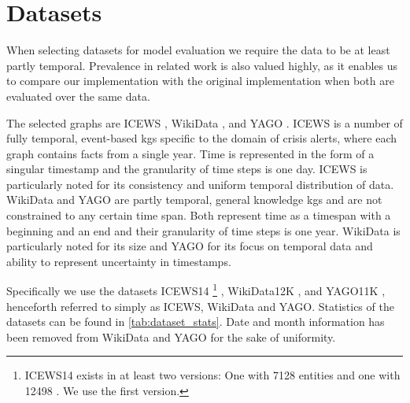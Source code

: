 \section{Datasets}
\label{sec:datasets}
When selecting datasets for model evaluation we require the data to be at least partly temporal. Prevalence in related work is also valued highly, as it enables us to compare our implementation with the original implementation when both are evaluated over the same data.



The selected graphs are ICEWS \cite{boschee2015ICEWS}, WikiData \cite{vrandecic2014wikidata}, and YAGO \cite{mahdisoltani2015YAGO3, tahon2020YAGO4}. 
ICEWS is a number of fully temporal, event-based \glspl{kg} specific to the domain of crisis alerts, where each graph contains facts from a single year.
Time is represented in the form of a singular timestamp and the granularity of time steps is one day.
ICEWS is particularly noted for its consistency and uniform temporal distribution of data. 
WikiData and YAGO are partly temporal, general knowledge \glspl{kg} and are not constrained to any certain time span.
Both represent time as a timespan with a beginning and an end and their granularity of time steps is one year.
WikiData is particularly noted for its size and YAGO for its focus on temporal data and ability to represent uncertainty in timestamps.

Specifically we use the datasets \mbox{ICEWS14}
\footnote{ICEWS14 exists in at least two versions: One with 7128 entities \cite{garcia-duran2018ta} and one with 12498 \cite{trivedi2017knowevolve}. We use the first version.}
, WikiData12K \cite{dasgupta2018hyte}, and YAGO11K \cite{dasgupta2018hyte}, henceforth referred to simply as ICEWS, WikiData and YAGO. Statistics of the datasets can be found in \autoref{tab:dataset_stats}. Date and month information has been removed from WikiData and YAGO for the sake of uniformity.